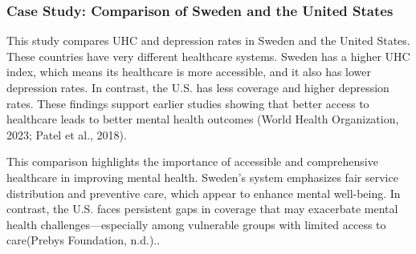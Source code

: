 \subsubsection{Case Study: Comparison of Sweden and the United States}

This study compares UHC and depression rates in Sweden and the United States. These countries have very different healthcare systems. Sweden has a higher UHC index, which means its healthcare is more accessible, and it also has lower depression rates. In contrast, the U.S. has less coverage and higher depression rates. These findings support earlier studies showing that better access to healthcare leads to better mental health outcomes (World Health Organization, 2023; Patel et al., 2018).

This comparison highlights the importance of accessible and comprehensive healthcare in improving mental health. Sweden’s system emphasizes fair service distribution and preventive care, which appear to enhance mental well-being. In contrast, the U.S. faces persistent gaps in coverage that may exacerbate mental health challenges—especially among vulnerable groups with limited access to care(Prebys Foundation, n.d.)..







